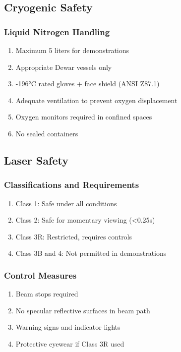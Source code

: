 \subsection{Cryogenic Safety}

\subsubsection{Liquid Nitrogen Handling}
\begin{enumerate}[noitemsep]
    \item Maximum 5 liters for demonstrations
    \item Appropriate Dewar vessels only
    \item -196°C rated gloves + face shield (ANSI Z87.1)
    \item Adequate ventilation to prevent oxygen displacement
    \item Oxygen monitors required in confined spaces
    \item No sealed containers
\end{enumerate}

\subsection{Laser Safety}

\subsubsection{Classifications and Requirements}
\begin{enumerate}[noitemsep]
    \item Class 1: Safe under all conditions
    \item Class 2: Safe for momentary viewing (<0.25s)
    \item Class 3R: Restricted, requires controls
    \item Class 3B and 4: Not permitted in demonstrations
\end{enumerate}

\subsubsection{Control Measures}
\begin{enumerate}[noitemsep]
    \item Beam stops required
    \item No specular reflective surfaces in beam path
    \item Warning signs and indicator lights
    \item Protective eyewear if Class 3R used
\end{enumerate}

